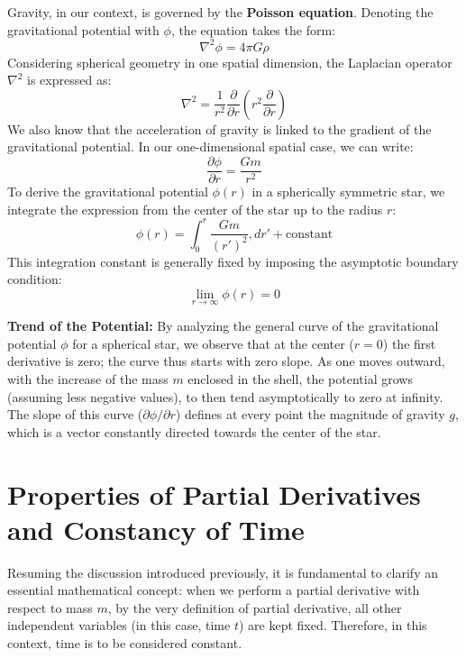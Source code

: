 Gravity, in our context, is governed by the \textbf{Poisson equation}. Denoting the gravitational potential with $\phi$, the equation takes the form:
\begin{equation}
\nabla^2 \phi = 4\pi G \rho
\end{equation}
Considering spherical geometry in one spatial dimension, the Laplacian operator $\nabla^2$ is expressed as:
\begin{equation}
\nabla^2 = \frac{1}{r^2} \frac{\partial}{\partial r} \left( r^2 \frac{\partial}{\partial r} \right)
\end{equation}
We also know that the acceleration of gravity is linked to the gradient of the gravitational potential. In our one-dimensional spatial case, we can write:
\begin{equation}
\frac{\partial \phi}{\partial r} = \frac{G m}{r^2}
\end{equation}
To derive the gravitational potential $\phi(r)$ in a spherically symmetric star, we integrate the expression from the center of the star up to the radius $r$:
\begin{equation}
\phi(r) = \int_0^r \frac{G m}{(r')^2} , dr' + \text{constant}
\end{equation}
This integration constant is generally fixed by imposing the asymptotic boundary condition:
\begin{equation}
\lim_{r \to \infty} \phi(r) = 0
\end{equation}

\textbf{Trend of the Potential:} By analyzing the general curve of the gravitational potential $\phi$ for a spherical star, we observe that at the center ($r=0$) the first derivative is zero; the curve thus starts with zero slope. As one moves outward, with the increase of the mass $m$ enclosed in the shell, the potential grows (assuming less negative values), to then tend asymptotically to zero at infinity. The slope of this curve ($\partial \phi / \partial r$) defines at every point the magnitude of gravity $g$, which is a vector constantly directed towards the center of the star.

\section{Properties of Partial Derivatives and Constancy of Time}

Resuming the discussion introduced previously, it is fundamental to clarify an essential mathematical concept: when we perform a partial derivative with respect to mass $m$, by the very definition of partial derivative, all other independent variables (in this case, time $t$) are kept fixed. Therefore, in this context, time is to be considered constant.


